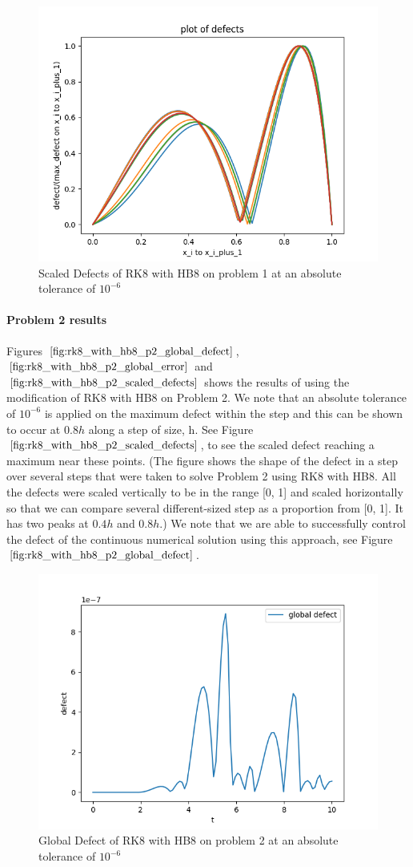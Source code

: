 \documentclass{article}
\begin{document}
\begin{figure}[H]
\centering
\includegraphics[width=0.7\linewidth]{./figures/rk8_with_hb8_p1_scaled_defects}
\caption{Scaled Defects of RK8 with HB8 on problem 1 at an absolute tolerance of $10^{-6}$}
\label{fig:rk8_with_hb8_p1_scaled_defects}
\end{figure}

\paragraph{Problem 2 results}
Figures $\ref{fig:rk8_with_hb8_p2_global_defect}$, $\ref{fig:rk8_with_hb8_p2_global_error}$ and $\ref{fig:rk8_with_hb8_p2_scaled_defects}$ shows the results of using the modification of RK8 with HB8 on Problem 2. We note that an absolute tolerance of $10^{-6}$ is applied on the maximum defect within the step and this can be shown to occur at $0.8h$ along a step of size, h. See Figure $\ref{fig:rk8_with_hb8_p2_scaled_defects}$, to see the scaled defect reaching a maximum near these points. (The figure shows the shape of the defect in a step over several steps that were taken to solve Problem 2 using RK8 with HB8. All the defects were scaled vertically to be in the range [0, 1] and scaled horizontally so that we can compare several different-sized step as a proportion from [0, 1]. It has two peaks at $0.4h$ and $0.8h$.) We note that we are able to successfully control the defect of the continuous numerical solution using this approach, see Figure $\ref{fig:rk8_with_hb8_p2_global_defect}$. 

\begin{figure}[H]
\centering
\includegraphics[width=0.7\linewidth]{./figures/rk8_with_hb8_p2_global_defect}
\caption{Global Defect of RK8 with HB8 on problem 2 at an absolute tolerance of $10^{-6}$}
\label{fig:rk8_with_hb8_p2_global_defect}
\end{figure}
\end{document}
